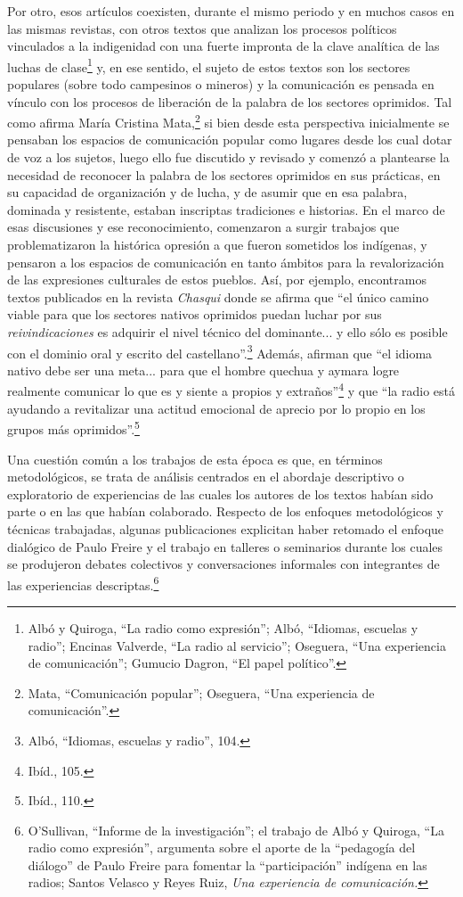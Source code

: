 \documentclass{tufte-handout}
\begin{document}
Por otro, esos artículos coexisten, durante el mismo periodo y en muchos
casos en las mismas revistas, con otros textos que analizan los procesos
políticos vinculados a la indigenidad con una fuerte impronta de la
clave analítica de las luchas de clase\footnote{Albó y Quiroga, ``La
  radio como expresión''; Albó, ``Idiomas, escuelas y radio''; Encinas
  Valverde, ``La radio al servicio''; Oseguera, ``Una experiencia de
  comunicación''; Gumucio Dagron, ``El papel político''.} y, en ese
sentido, el sujeto de estos textos son los sectores populares (sobre
todo campesinos o mineros) y la comunicación es pensada en vínculo con
los procesos de liberación de la palabra de los sectores oprimidos. Tal
como afirma María Cristina Mata,\footnote{Mata, ``Comunicación
  popular''; Oseguera, ``Una experiencia de comunicación''.} si bien
desde esta perspectiva inicialmente se pensaban los espacios de
comunicación popular como lugares desde los cual dotar de voz a los
sujetos, luego ello fue discutido y revisado y comenzó a plantearse la
necesidad de reconocer la palabra de los sectores oprimidos en sus
prácticas, en su capacidad de organización y de lucha, y de asumir que
en esa palabra, dominada y resistente, estaban inscriptas tradiciones e
historias. En el marco de esas discusiones y ese reconocimiento,
comenzaron a surgir trabajos que problematizaron la histórica opresión a
que fueron sometidos los indígenas, y pensaron a los espacios de
comunicación en tanto ámbitos para la revalorización de las expresiones
culturales de estos pueblos. Así, por ejemplo, encontramos textos
publicados en la revista \emph{Chasqui} donde se afirma que ``el único
camino viable para que los sectores nativos oprimidos puedan luchar por
sus \emph{reivindicaciones} es adquirir el nivel técnico del
dominante... y ello sólo es posible con el dominio oral y escrito del
castellano''.\footnote{Albó, ``Idiomas, escuelas y radio'', 104.}
Además, afirman que ``el idioma nativo debe ser una meta... para que el
hombre quechua y aymara logre realmente comunicar lo que es y siente a
propios y extraños''\footnote{Ibíd., 105.} y que ``la radio está
ayudando a revitalizar una actitud emocional de aprecio por lo propio en
los grupos más oprimidos''.\footnote{Ibíd., 110.}

Una cuestión común a los trabajos de esta época es que, en términos
metodológicos, se trata de análisis centrados en el abordaje descriptivo
o exploratorio de experiencias de las cuales los autores de los textos
habían sido parte o en las que habían colaborado. Respecto de los
enfoques metodológicos y técnicas trabajadas, algunas publicaciones
explicitan haber retomado el enfoque dialógico de Paulo Freire y el
trabajo en talleres o seminarios durante los cuales se produjeron
debates colectivos y conversaciones informales con integrantes de las
experiencias descriptas.\footnote{O'Sullivan, ``Informe de la
  investigación''; el trabajo de Albó y Quiroga, ``La radio como
  expresión'', argumenta sobre el aporte de la ``pedagogía del diálogo''
  de Paulo Freire para fomentar la ``participación'' indígena en las
  radios; Santos Velasco y Reyes Ruiz, \emph{Una experiencia de
  comunicación.}}
\end{document}
